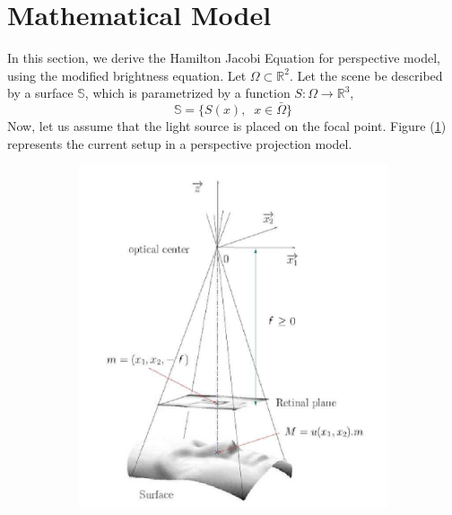 \section{Mathematical Model}
In this section, we derive the Hamilton Jacobi Equation for
perspective model, using the modified brightness equation\cite{prados2}. Let
$\Omega \subset \mathbb{R}^2$. Let the scene be described by a
surface $\mathbb{S}$, which is parametrized by a function $S : \Omega
\to \mathbb{R}^3$,
\begin{equation}
  \mathbb{S} = \{S(x), \;\; x \in \bar{\Omega}\}
\end{equation}
Now, let us assume that the light source is placed on the focal
point. Figure (\ref{fig:3a}) represents the current setup in a
perspective projection model.\\
\begin{figure}
  \begin{subfigure}{0.5\textwidth}
    \includegraphics[scale = 0.5]{images/persp2.png}
    \label{fig:3a}
  \end{subfigure}
  \begin{subfigure}{0.5\textwidth}

\end{subfigure}
\end{figure}
